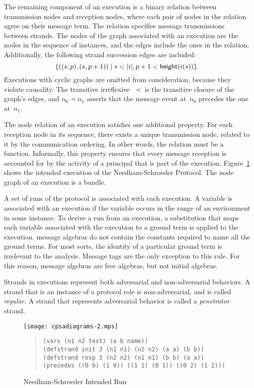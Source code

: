 \documentclass[12pt]{article}
\begin{document}
The remaining component of an execution is a binary relation between
transmission nodes and reception nodes, where each pair of nodes in
the relation agree on their message term.  The relation specifies
message transmissions between strands.  The nodes of the graph
associated with an execution are the nodes in the sequence of
instances, and the edges include the ones in the relation.
Additionally, the following strand succession edges are included: $$\{((s,p), (s, p+1))\mid s<|i|,
p+1<\cn{height}(i(s))\}.$$ Executions with cyclic graphs are omitted
from consideration, because they violate causality.  The transitive
irreflexive~$\prec$ is the transitive closure of the graph's edges,
and $n_0\prec n_1$ asserts that the message event at~$n_0$ precedes
the one at~$n_1$.

The node relation of an execution satisfies one additional property.
For each reception node in its sequence, there exists a unique
transmission node, related to it by the communication ordering.  In
other words, the relation must be a function.  Informally, this
property ensures that every message reception is accounted for by the
activity of a principal that is part of the execution.
Figure~\ref{fig:ns intended} shows the intended execution of the
Needham-Schroeder Protocol.  The node graph of an execution is a
bundle.

A set of runs of the protocol is associated with each execution.  A
variable is associated with an execution if the variable occurs in the
range of an environment in some instance.  To derive a run from an
execution, a substitution that maps each variable associated with the
execution to a ground term is applied to the execution.  {\cpsa}
message algebras do not contain the constants required to name all the
ground terms.  For most sorts, the identity of a particular ground
term is irrelevant to the analysis.  Message tags are the only
exception to this rule.  For this reason, {\cpsa} message algebras are
free algebras, but not initial algebras.

Strands in executions represent both adversarial and non-adversarial
behaviors.  A strand that is an instance of a protocol role is
non-adversarial, and is called \emph{regular.}  A
strand that represents adversarial behavior is called a
\emph{penetrator} strand.

\begin{figure}
\begin{center}
\texttt{[image: cpsadiagrams-2.mps]}
\end{center}
\begin{quote}
\begin{verbatim}
(vars (n1 n2 text) (a b name))
(defstrand init 3 (n1 n1) (n2 n2) (a a) (b b))
(defstrand resp 3 (n2 n2) (n1 n1) (b b) (a a))
(precedes ((0 0) (1 0)) ((1 1) (0 1)) ((0 2) (1 2)))
\end{verbatim}
\end{quote}
\caption{Needham-Schroeder Intended Run}
\label{fig:ns intended}
\end{figure}
\end{document}
